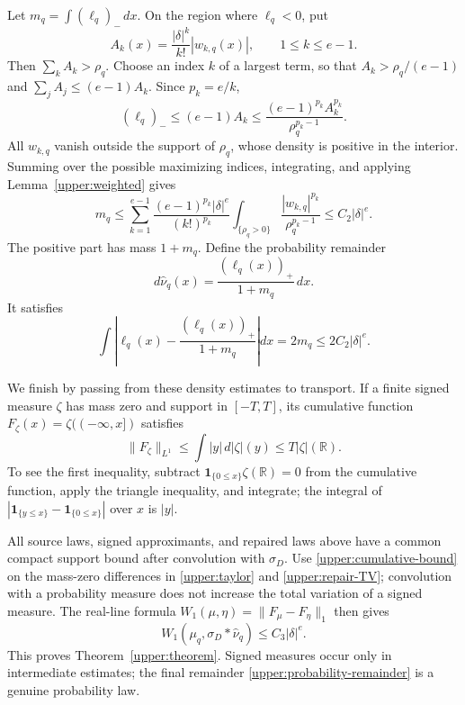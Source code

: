 \documentclass[11pt,letterpaper]{article}
\theoremstyle{definition}
\theoremstyle{remark}
\newcommand{\R}{\mathbb R}
\begin{document}
Let $m_q=\int(\ell_q)_-\,dx$.  On the region where $\ell_q<0$, put
\[
 A_k(x)=\frac{|\delta|^k}{k!}|w_{k,q}(x)|,
 \qquad 1\le k\le e-1.
\]
Then $\sum_kA_k>\rho_q$.  Choose an index $k$ of a largest term, so that
$A_k>\rho_q/(e-1)$ and $\sum_jA_j\le(e-1)A_k$.  Since $p_k=e/k$,
\[
 (\ell_q)_-
 \le(e-1)A_k
 \le\frac{(e-1)^{p_k}A_k^{p_k}}{\rho_q^{p_k-1}}.
\]
All $w_{k,q}$ vanish outside the support of $\rho_q$, whose density is
positive in the interior.  Summing over the possible maximizing indices,
integrating, and applying Lemma~\ref{upper:weighted} gives
\begin{equation}\label{upper:negative-mass}
 m_q\le
 \sum_{k=1}^{e-1}
 \frac{(e-1)^{p_k}|\delta|^e}{(k!)^{p_k}}
 \int_{\{\rho_q>0\}}
 \frac{|w_{k,q}|^{p_k}}{\rho_q^{p_k-1}}
 \le C_2|\delta|^e.
\end{equation}
The positive part has mass $1+m_q$.  Define the probability remainder
\begin{equation}\label{upper:probability-remainder}
 d\widehat\nu_q(x)=\frac{(\ell_q(x))_+}{1+m_q}\,dx.
\end{equation}
It satisfies
\begin{equation}\label{upper:repair-TV}
 \int\left|\ell_q(x)-\frac{(\ell_q(x))_+}{1+m_q}\right|dx
 =2m_q\le2C_2|\delta|^e.
\end{equation}

We finish by passing from these density estimates to transport.  If a
finite signed measure $\zeta$ has mass zero and support in $[-T,T]$, its
cumulative function $F_\zeta(x)=\zeta(( -\infty,x])$ satisfies
\begin{equation}\label{upper:cumulative-bound}
 \|F_\zeta\|_{L^1}\le
 \int |y|\,d|\zeta|(y)\le T|\zeta|(\R).
\end{equation}
To see the first inequality, subtract
$\mathbf1_{\{0\le x\}}\zeta(\R)=0$ from the cumulative function,
apply the triangle inequality, and integrate; the integral of
$|\mathbf1_{\{y\le x\}}-\mathbf1_{\{0\le x\}}|$ over $x$ is $|y|$.

All source laws, signed approximants, and repaired laws above have a
common compact support bound after convolution with $\sigma_D$.
Use \eqref{upper:cumulative-bound} on the mass-zero differences in
\eqref{upper:taylor} and \eqref{upper:repair-TV}; convolution with a
probability measure does not increase the total variation of a signed
measure.  The real-line formula $W_1(\mu,\eta)=\|F_\mu-F_\eta\|_1$
then gives
\[
 W_1(\mu_q,\sigma_D*\widehat\nu_q)
 \le C_3|\delta|^e.
\]
This proves Theorem~\ref{upper:theorem}.  Signed measures occur only in
intermediate estimates; the final remainder
\eqref{upper:probability-remainder} is a genuine probability law.
\end{document}
